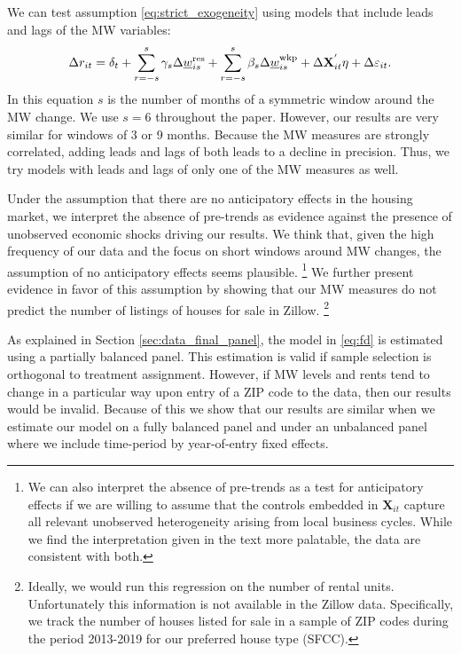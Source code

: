 We can test assumption \eqref{eq:strict_exogeneity} using models that include 
leads and lags of the MW variables:
\begin{equation} \label{eq:fd_leads_lags}
    \Delta r_{it} = \delta_t
                  + \sum_{r=-s}^{s} \gamma_s \Delta \underline{w}^{\text{res}}_{is} 
                  + \sum_{r=-s}^{s} \beta_s \Delta \underline{w}^{\text{wkp}}_{is}
                  + \Delta \mathbf{X}^{'}_{it}\eta
                  + \Delta \varepsilon_{it} .
\end{equation}
In this equation $s$ is the number of months of a symmetric window around the 
MW change.
We use $s=6$ throughout the paper. However, our results are very similar for 
windows of 3 or 9 months.
Because the MW measures are strongly correlated, adding leads and lags of both 
leads to a decline in precision.
Thus, we try models with leads and lags of only one of the MW measures as well.

Under the assumption that there are no anticipatory effects in the housing 
market, we interpret the absence of pre-trends as evidence against the presence 
of unobserved economic shocks driving our results.
We think that, given the high frequency of our data and the focus on short 
windows around MW changes, the assumption of no anticipatory effects seems 
plausible.%
\footnote{We can also interpret the absence of pre-trends as a test for 
anticipatory effects if we are willing to assume that the controls embedded in 
$\mathbf{X}_{it}$ capture all relevant unobserved heterogeneity arising from 
local business cycles.
While we find the interpretation given in the text more palatable, the data are 
consistent with both.}
We further present evidence in favor of this assumption by showing that our MW 
measures do not predict the number of listings of houses for sale in Zillow.%
\footnote{Ideally, we would run this regression on the number of rental units.
Unfortunately this information is not available in the Zillow data.
Specifically, we track the number of houses listed for sale in a sample of ZIP 
codes during the period 2013-2019 for our preferred house type (SFCC).}

As explained in Section \ref{sec:data_final_panel}, 
the model in \eqref{eq:fd} is estimated using a partially balanced panel.
This estimation is valid if sample selection is orthogonal to treatment 
assignment.
However, if MW levels and rents tend to change in a particular way upon entry 
of a ZIP code to the data, then our results would be invalid.
Because of this we show that our results are similar when we estimate our model
on a fully balanced panel and under an unbalanced panel where we include 
time-period by year-of-entry fixed effects.

